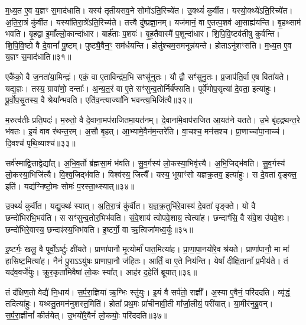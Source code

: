 म॒ध्य॒त ए॒व य॒ज्ञꣳ स॒माद॑धाति।
यस्य॑ तृतीयसव॒ने सोमो॑\-ऽति॒रिच्ये॑त।
उ॒क्थ्यं॑ कुर्वीत।
यस्यो॒क्थ्ये॑\-ऽति॒रिच्ये॑त।
अ॒ति॒रा॒त्रं कु॑र्वीत।
यस्या॑तिरा॒त्रे॑\-ऽति॒\-रिच्य॑ते।
तत्त्वै दु॑ष्प्रज्ञा॒नम्।
यज॑मानं॒ वा ए॒तत्प॒शव॑ आ॒साह्य॑यन्ति।
बृ॒हथ्साम॑ भवति।
बृ॒हद्वा इ॒माँल्लो॒कान्दा॑धार।
बार्\mbox{}ह॑ताः प॒शवः॑।
बृ॒ह॒तैवास्मै॑ प॒शून्दा॑धार।
शि॒पि॒वि॒ष्टव॑तीषु कुर्वन्ति।
शि॒पि॒वि॒ष्टो वै दे॒वानां᳚ पु॒ष्टम्।
पुष्ट्यै॒वैन॒ꣳ॒ सम॑र्धयन्ति।
होतु॑श्चम॒समनून्न॑यन्ते।
होताऽनु॑शꣳसति।
म॒ध्य॒त ए॒व य॒ज्ञꣳ स॒माद॑धाति॥३१॥\ip\anuvakamend[य॒न्ति॒ सव॑नस्याति॒\-रिच्य॑ते शꣳसति दाधारा॒ष्टौ च॑]

एकै॑को॒ वै ज॒नता॑या॒मिन्द्रः॑।
एकं॒ वा ए॒ताविन्द्र॑म॒भि सꣳसु॑नुतः।
यौ द्वौ सꣳ॑सुनु॒तः।
प्र॒जा\-प॑ति॒र्वा ए॒ष विता॑यते।
यद्य॒ज्ञः।
तस्य॒ ग्रावा॑णो॒ दन्ताः᳚।
अ॒न्य॒त॒रं वा ए॒ते सꣳ॑सुन्व॒तोर्निर्ब॑फ्सति।
पूर्वे॑णोप॒सृत्या॑ दे॒वता॒ इत्या॑हुः।
पू॒र्वो॒प॒सृ॒तस्य॒ वै श्रेया᳚न्भवति।
एति॑व॒न्त्याज्या॑नि भवन्त्य॒भिजि॑त्यै॥३२॥\ip

म॒रुत्व॑तीः प्रति॒पदः॑।
म॒रुतो॒ वै दे॒वाना॒मप॑राजितमा॒यत॑नम्।
दे॒वाना॑मे॒वाप॑राजित आ॒यत॑ने यतते।
उ॒भे बृ॑हद्रथन्त॒रे भ॑वतः।
इ॒यं वाव र॑थन्त॒रम्।
अ॒सौ बृ॒हत्।
आ॒भ्यामे॒वैन॑म॒न्तरे॑ति।
वा॒चश्च॒ मन॑सश्च।
प्रा॒णाच्चा॑पा॒नाच्च॑।
दि॒वश्च॑ पृथि॒व्याश्च॑॥३३॥\ip

सर्व॑स्माद्वि॒त्ताद्वेद्या᳚त्।
अ॒भि॒व॒र्तो ब्र॑ह्मसा॒मं भ॑वति।
सु॒व॒र्गस्य॑ लो॒कस्या॒भिवृ॑त्त्यै।
अ॒भि॒जिद्भ॑वति।
सु॒व॒र्गस्य॑ लो॒कस्या॒भिजि॑त्यै।
वि॒श्व॒जिद्भ॑वति।
विश्व॑स्य॒ जित्यै᳚।
यस्य॒ भूयाꣳ॑सो यज्ञक्र॒तव॒ इत्या॑हुः।
स दे॒वता॑ वृङ्क्त॒ इति॑।
यद्य॑ग्निष्टो॒मः सोमः॑ प॒रस्ता॒थ्स्यात्॥३४॥\ip

उ॒क्थ्यं॑ कुर्वीत।
यद्यु॒क्थः॑ स्यात्।
अ॒ति॒रा॒त्रं कु॑र्वीत।
य॒ज्ञ॒क्र॒तुभि॑रे॒वास्य॑ दे॒वता॑ वृङ्क्ते।
यो वै छन्दो॑भिरभि॒भव॑ति।
स सꣳ॑सुन्व॒तोर॒भिभ॑वति।
सं॒वे॒शाय॑ त्वोपवे॒शाय॒ त्वेत्या॑ह।
छन्दाꣳ॑सि॒ वै सं॑वे॒श उ॑पवे॒शः।
छन्दो॑भिरे॒वास्य॒ छन्दाꣴ॑स्य॒भिभ॑वति।
इ॒ष्टर्गो॒ वा ऋ॒त्विजा॑मध्व॒र्युः॥३५॥\ip

इ॒ष्टर्गः॒ खलु॒ वै पूर्वो॒\-ऽर्ष्टुः क्षी॑यते।
प्राणा॑पानौ मृ॒त्योर्मा॑ पात॒मित्या॑ह।
प्रा॒णा॒पा॒नयो॑रे॒व श्र॑यते।
प्राणा॑पानौ॒ मा मा॑ हासिष्ट॒मित्या॑ह।
नैनं॑ पु॒रा\-ऽऽयु॑षः प्राणापा॒नौ ज॑हितः।
आर्तिं॒ वा ए॒ते निय॑न्ति।
येषां᳚ दीक्षि॒तानां᳚ प्र॒मीय॑ते।
तं यद॑व॒वर्जे॑युः।
क्रू॒र॒कृता॑मिवैषां लो॒कः स्या᳚त्।
आह॑र द॒हेति॑ ब्रूयात्॥३६॥\ip

तं द॑क्षिण॒तो वेद्यै॑ नि॒धाय॑।
स॒र्प॒रा॒ज्ञिया॑ ऋ॒ग्भिः स्तु॑युः।
इ॒यं वै सर्प॑तो॒ राज्ञी᳚।
अ॒स्या ए॒वैनं॒ परि॑ददति।
व्यृ॑द्धं॒ तदित्या॑हुः।
यथ्स्तु॒तमन॑नुशस्त॒मिति॑।
होता᳚ प्रथ॒मः प्रा॑चीनावी॒ती मा᳚र्जा॒लीयं॒ परी॑यात्।
या॒मीर॑नुब्रु॒वन्।
स॒र्प॒रा॒ज्ञीनां᳚ कीर्तयेत्।
उ॒भयो॑रे॒वैनं॑ लो॒कयोः॒ परि॑ददति॥३७॥\ip

